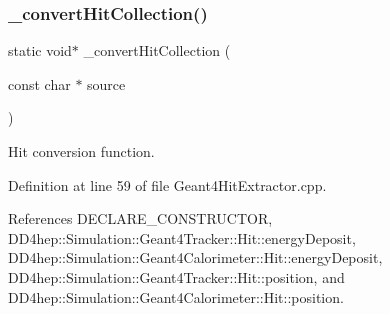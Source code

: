 \subsubsection{\texorpdfstring{\+\_\+convert\+Hit\+Collection()}{\_convertHitCollection()}}
{\footnotesize\ttfamily static void$\ast$ \+\_\+convert\+Hit\+Collection (\begin{DoxyParamCaption}\item[{const char $\ast$}]{source }\end{DoxyParamCaption})\hspace{0.3cm}{\ttfamily [static]}}



Hit conversion function. 



Definition at line 59 of file Geant4\+Hit\+Extractor.\+cpp.



References D\+E\+C\+L\+A\+R\+E\+\_\+\+C\+O\+N\+S\+T\+R\+U\+C\+T\+OR, D\+D4hep\+::\+Simulation\+::\+Geant4\+Tracker\+::\+Hit\+::energy\+Deposit, D\+D4hep\+::\+Simulation\+::\+Geant4\+Calorimeter\+::\+Hit\+::energy\+Deposit, D\+D4hep\+::\+Simulation\+::\+Geant4\+Tracker\+::\+Hit\+::position, and D\+D4hep\+::\+Simulation\+::\+Geant4\+Calorimeter\+::\+Hit\+::position.

